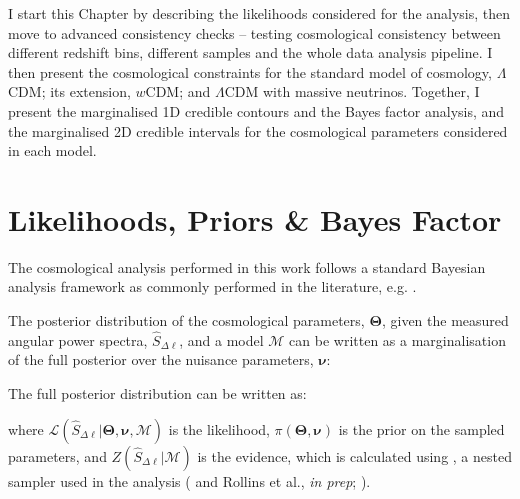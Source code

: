 \qquad I start this Chapter by describing the likelihoods considered for the analysis, then move to advanced consistency checks -- testing cosmological consistency between different redshift bins, different samples and the whole data analysis pipeline. I then present the cosmological constraints for the standard model of cosmology, $\Lambda$CDM; its extension, $w$CDM; and $\Lambda$CDM with massive neutrinos. Together, I present the marginalised 1D credible contours and the Bayes factor analysis, and the marginalised 2D credible intervals for the cosmological parameters considered in each model.

\section{Likelihoods, Priors \& Bayes Factor}\label{Sec:LikelihoodsPriors}

The cosmological analysis performed in this work follows a standard Bayesian analysis framework as commonly performed in the literature, e.g. \cite{Blake2007,Thomas2011,2017MNRAS.465.1454H,2017arXiv170801530D}. 

\qquad The posterior distribution of the cosmological parameters, $\pmb{\Theta}$, given the measured angular power spectra, $\hat{S}_{\Delta\ell}$, and a model $\mathcal{M}$ can be written as a marginalisation of the full posterior over the nuisance parameters, $\pmb{\nu}$:

The full posterior distribution can be written as:

where $\mathcal{L}(\hat{S}_{\Delta\ell}|\pmb{\Theta}, \pmb{\nu}, \mathcal{M})$ is the likelihood, $\pi(\pmb{\Theta}, \pmb{\nu})$ is the prior on the sampled parameters, and $Z({\hat{S}_{\Delta\ell}}| \mathcal{M})$ is the evidence, which is calculated using \pliny , a nested sampler used in the analysis (\citealt{PlinyRichardThesis} and Rollins et al., \textit{in prep}; \cite{2008FerozHobson}).


